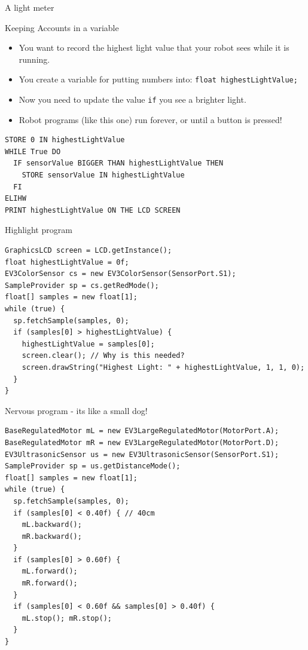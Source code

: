 \documentclass[color=pdftex,usenames,dvipsnames, aspectratio=169]{beamer}
\begin{document}
\begin{frame}[fragile, label=highlightPDL]{A light meter}
\begin{block}{Keeping Accounts in a variable}
\begin{itemize}
\item You want to record the highest light value that your robot sees while it is running.
\item You create a variable for putting numbers into: \lstinline!float highestLightValue;!
\item Now you need to update the value \lstinline!if! you see a brighter light.
\item Robot programs (like this one) run forever, or until a button is pressed!
\end{itemize}
\end{block}

\begin{lstlisting}[emph={FI,IF,DO,WHILE,ELIHW},linewidth=12cm]
STORE 0 IN highestLightValue
WHILE True DO
  IF sensorValue BIGGER THAN highestLightValue THEN
    STORE sensorValue IN highestLightValue
  FI
ELIHW
PRINT highestLightValue ON THE LCD SCREEN
\end{lstlisting}


\end{frame}

\begin{frame}[fragile,label=highlight]{Highlight program}
\begin{lstlisting}
GraphicsLCD screen = LCD.getInstance();
float highestLightValue = 0f;
EV3ColorSensor cs = new EV3ColorSensor(SensorPort.S1);
SampleProvider sp = cs.getRedMode();
float[] samples = new float[1]; 
while (true) {
  sp.fetchSample(samples, 0);
  if (samples[0] > highestLightValue) {
    highestLightValue = samples[0];
    screen.clear(); // Why is this needed?
    screen.drawString("Highest Light: " + highestLightValue, 1, 1, 0);
  }
}
\end{lstlisting}

\end{frame}
\begin{frame}[fragile]{Nervous program - its like a small dog!}
\begin{lstlisting}[emph={while, true},basicstyle=\ttfamily\scriptsize\color{blue}]
BaseRegulatedMotor mL = new EV3LargeRegulatedMotor(MotorPort.A);
BaseRegulatedMotor mR = new EV3LargeRegulatedMotor(MotorPort.D);
EV3UltrasonicSensor us = new EV3UltrasonicSensor(SensorPort.S1);
SampleProvider sp = us.getDistanceMode();
float[] samples = new float[1];
while (true) {
  sp.fetchSample(samples, 0);
  if (samples[0] < 0.40f) { // 40cm
    mL.backward();
    mR.backward();
  }
  if (samples[0] > 0.60f) {
    mL.forward();
    mR.forward();
  }
  if (samples[0] < 0.60f && samples[0] > 0.40f) {
    mL.stop(); mR.stop();
  }
}
\end{lstlisting}
\end{frame}
\end{document}
